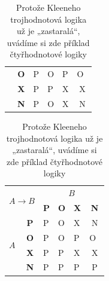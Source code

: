 \documentclass[a4paper, 11pt]{article}
\begin{document}
\begin{table}[h]
\begin{tabular}{| c | c | c | c | c | c |}
					\multicolumn{1}{|l|}{}                     & \textbf{O} & \multicolumn{1}{l|}{P} & \multicolumn{1}{l|}{O} & \multicolumn{1}{l|}{P} & O~ \\ \cline{2-6} 
					\multicolumn{1}{|l|}{}                     & \textbf{X} & \multicolumn{1}{l|}{P} & \multicolumn{1}{l|}{P} & \multicolumn{1}{l|}{X} & X  \\ \cline{2-6} 
					\multicolumn{1}{|l|}{}                     & \textbf{N} & \multicolumn{1}{l|}{P} & \multicolumn{1}{l|}{O} & \multicolumn{1}{l|}{X} & N  \\ \hline
				\end{tabular}
				\begin{tabular}{| c | c | c | c | c | c |}
					\hline
					\multicolumn{2}{|l|}{\multirow{2}{*}{$A \to B$}}            & \multicolumn{4}{c|}{$B$}                                                                                           \\ \cline{3-6} 
					\multicolumn{2}{|l|}{}                                & \multicolumn{1}{l|}{\textbf{P}} & \multicolumn{1}{l|}{\textbf{O}} & \multicolumn{1}{l|}{\textbf{X}} & \textbf{N} \\ \hline
					\multicolumn{1}{|l|}{\multirow{4}{*}{$A$}} & \textbf{P} & \multicolumn{1}{l|}{P} & \multicolumn{1}{l|}{O} & \multicolumn{1}{l|}{X} & N  \\ \cline{2-6} 
					\multicolumn{1}{|l|}{}                     & \textbf{O} & \multicolumn{1}{l|}{P} & \multicolumn{1}{l|}{O} & \multicolumn{1}{l|}{P} & O~ \\ \cline{2-6} 
					\multicolumn{1}{|l|}{}                     & \textbf{X} & \multicolumn{1}{l|}{P} & \multicolumn{1}{l|}{P} & \multicolumn{1}{l|}{X} & X  \\ \cline{2-6} 
					\multicolumn{1}{|l|}{}                     & \textbf{N} & \multicolumn{1}{l|}{P} & \multicolumn{1}{l|}{P} & \multicolumn{1}{l|}{P} & P  \\ \hline
				\end{tabular}
				\caption{Protože Kleeneho trojhodnotová logika už je „zastaralá“, uvádíme si zde příklad čtyřhodnotové
					logiky}\label{tab:logika}
			\end{table}
			\bigskip
\end{document}
